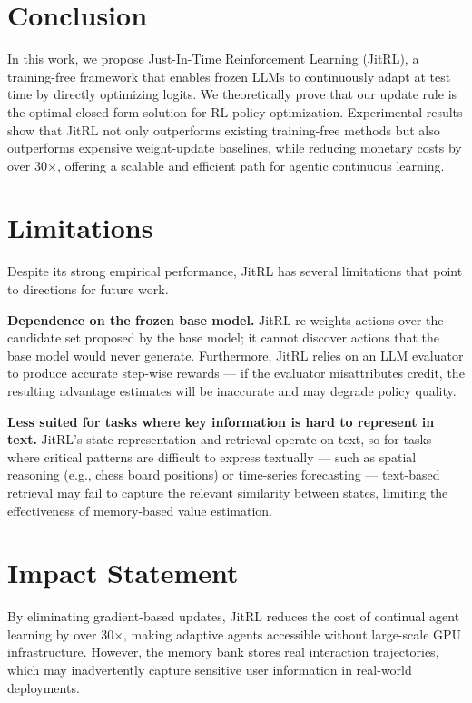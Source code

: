\section{Conclusion}


In this work, we propose Just-In-Time Reinforcement Learning (JitRL), a training-free framework that enables frozen LLMs to continuously adapt at test time by directly optimizing logits. We theoretically prove that our update rule is the optimal closed-form solution for RL policy optimization. 
Experimental results show that JitRL not only outperforms existing training-free methods but also outperforms expensive weight-update baselines, while reducing monetary costs by over 30$\times$, offering a scalable and efficient path for agentic continuous learning.



\section*{Limitations}

Despite its strong empirical performance, JitRL has several limitations that point to directions for future work.

\textbf{Dependence on the frozen base model.} JitRL re-weights actions over the candidate set proposed by the base model; it cannot discover actions that the base model would never generate. Furthermore, JitRL relies on an LLM evaluator to produce accurate step-wise rewards — if the evaluator misattributes credit, the resulting advantage estimates will be inaccurate and may degrade policy quality.

\textbf{Less suited for tasks where key information is hard to represent in text.} JitRL's state representation and retrieval operate on text, so for tasks where critical patterns are difficult to express textually — such as spatial reasoning (e.g., chess board positions) or time-series forecasting — text-based retrieval may fail to capture the relevant similarity between states, limiting the effectiveness of memory-based value estimation.



\section*{Impact Statement}

By eliminating gradient-based updates, JitRL reduces the cost of continual agent learning by over 30$\times$, making adaptive agents accessible without large-scale GPU infrastructure. However, the memory bank stores real interaction trajectories, which may inadvertently capture sensitive user information in real-world deployments.


